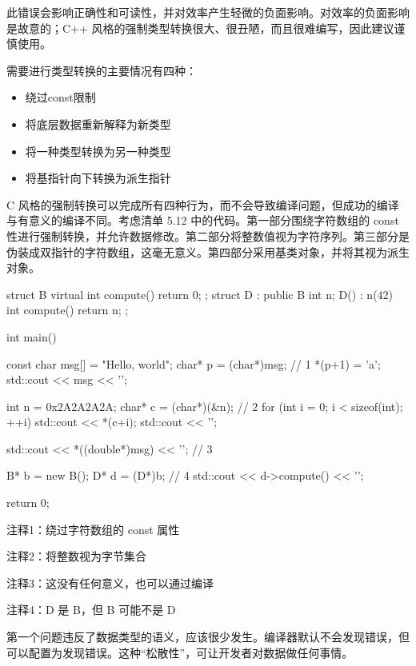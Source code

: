 此错误会影响正确性和可读性，并对效率产生轻微的负面影响。对效率的负面影响是故意的；C++ 风格的强制类型转换很大、很丑陋，而且很难编写，因此建议谨慎使用。


需要进行类型转换的主要情况有四种：

\begin{itemize}
\item
绕过const限制

\item
将底层数据重新解释为新类型

\item
将一种类型转换为另一种类型

\item
将基指针向下转换为派生指针
\end{itemize}

C 风格的强制转换可以完成所有四种行为，而不会导致编译问题，但成功的编译与有意义的编译不同。考虑清单 5.12 中的代码。第一部分围绕字符数组的 const 性进行强制转换，并允许数据修改。第二部分将整数值视为字符序列。第三部分是伪装成双指针的字符数组，这毫无意义。第四部分采用基类对象，并将其视为派生对象。


\begin{cpp}
struct B {
  virtual int compute() { return 0; }
};
struct D : public B {
  int n;
  D() : n(42) {}
  int compute() { return n; }
};

int main() {
  const char msg[] = "Hello, world";
  char* p = (char*)msg; // 1
  *(p+1) = 'a';
  std::cout << msg << '\n';

  int n = 0x2A2A2A2A;
  char* c = (char*)(&n); // 2
  for (int i = 0; i < sizeof(int); ++i)
    std::cout << *(c+i);
  std::cout << '\n';

  std::cout << *((double*)msg) << '\n'; // 3

  B* b = new B();
  D* d = (D*)b; // 4
  std::cout << d->compute() << '\n';

  return 0;
}
\end{cpp}

{\footnotesize
注释1：绕过字符数组的 const 属性

注释2：将整数视为字节集合

注释3：这没有任何意义，也可以通过编译

注释4：D 是 B，但 B 可能不是 D
}


第一个问题违反了数据类型的语义，应该很少发生。编译器默认不会发现错误，但可以配置为发现错误。这种“松散性”，可让开发者对数据做任何事情。

